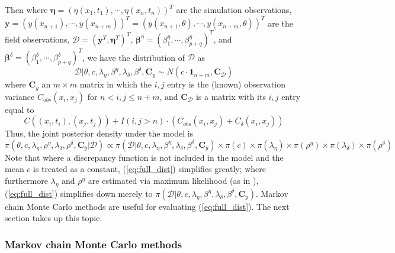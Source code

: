 \documentclass{article}
\begin{document}
Then where $\boldsymbol \eta = (\eta(x_1,t_1),\cdots,\eta(x_n,t_n))^T$ are the simulation observations, $\mathbf y = (y(x_{n+1}),\cdots,y(x_{n+m}))^T= (y(x_{n+1},\theta),\cdots,y(x_{n+m},\theta))^T$ are the field observations, $\mathcal D = (\mathbf y^T, \boldsymbol \eta^T)^T$, $\boldsymbol \beta^\eta = (\beta^\eta_1,\cdots,\beta_{p+q}^\eta)^T$, and $\boldsymbol \beta^\delta = (\beta^\delta_1,\cdots,\beta_{p+q}^\delta)^T$, we have the distribution of $\mathcal D$ as
\begin{equation}
\mathcal D | \theta,c,\lambda_\eta, \beta^\eta,\lambda_\delta,\beta^\delta,\mathbf C_y \sim N(c \cdot \mathbf 1_{n+m}, \mathbf C_{\mathcal D})
\end{equation}
where $\mathbf C_y$ an $m\times m$ matrix in which the $i,j$ entry is the (known) observation variance $C_{obs}(x_i,x_j)$ for $n<i,j\leq n+m$, and $\mathbf C_{\mathcal D}$ is a matrix with its $i,j$ entry equal to
\begin{equation}
C((x_i,t_i),(x_j,t_j)) + I(i,j>n)\cdot(C_{obs}(x_i,x_j) + C_\delta(x_i,x_j))
\end{equation}
Thus, the joint posterior density under the model is
\begin{equation} \label{eq:full_dist}
\pi(\theta,c,\lambda_\eta,\rho^\eta,\lambda_\delta,\rho^\delta,\mathbf C_y|\mathcal D)
\propto \pi(\mathcal D | \theta,c,\lambda_\eta, \beta^\eta,\lambda_\delta,\beta^\delta,\mathbf C_y) \times \pi(c) \times \pi(\lambda_\eta) \times 
\pi(\rho^\eta) \times \pi(\lambda_\delta) \times \pi(\rho^\delta)
\end{equation}
Note that where a discrepancy function is not included in the model and the mean $c$ is treated as a constant, (\ref{eq:full_dist}) simplifies greatly; where furthermore $\lambda_\eta$ and $\rho^\eta$ are estimated via maximum likelihood (as in  \cite{Kennedy2001}),  (\ref{eq:full_dist}) simplifies down merely to 
$\pi(\mathcal D | \theta,c,\lambda_\eta, \beta^\eta,\lambda_\delta,\beta^\delta,\mathbf C_y)$. Markov chain Monte Carlo methods are useful for evaluating (\ref{eq:full_dist}). The next section takes up this topic.

\subsubsection{Markov chain Monte Carlo methods}\label{MCMC_methods}

\end{document}
